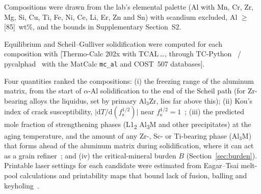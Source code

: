 \documentclass[preprint,12pt]{elsarticle}
\newcommand{\note}[1]{}
\newcommand{\note}[1]{\textcolor{blue!70!black}{\textsf{\footnotesize [Note: #1]}}}
\newcommand{\placeholder}[1]{\textcolor{red!75!black}{[#1]}}
\begin{document}
Compositions were drawn from the lab's elemental palette (Al with Mn, Cr, Zr, Mg, Si, Cu, Ti, Fe, Ni, Ce, Li, Er, Zn and Sn) with scandium excluded, Al $\geq$ \placeholder{85}~wt\%, and the bounds in Supplementary Section~S2.
\note{The kickoff (11:29) suggested keeping Si out unless composition can be verified for Si-bearing alloys. Spark-OES (ASTM E1251) on a printed coupon avoids the digestion problem; decide before the screen.}
Equilibrium and Scheil--Gulliver solidification were computed for each composition with \placeholder{Thermo-Calc 202x with TCAL\,\dots, through TC-Python~\cite{andersson2002} / pycalphad~\cite{otis2017} with the MatCalc \texttt{mc\_al} and COST~507 databases}.
\note{No Thermo-Calc licence yet (\#141). The open-database screen cannot predict the Al\textsubscript{3}Zr liquidus (MatCalc mc\_al has none, per \#275), which matters for every Zr-bearing candidate. If Thermo-Calc arrives late, re-check the finalists in it and report both.}
Four quantities ranked the compositions:
(i) the freezing range of the aluminum matrix, from the start of $\alpha$-Al solidification to the end of the Scheil path (for Zr-bearing alloys the liquidus, set by primary Al$_3$Zr, lies far above this);
(ii) Kou's index of crack susceptibility, $\lvert \mathrm{d}T / \mathrm{d}(f_\mathrm{s}^{1/2}) \rvert$ near $f_\mathrm{s}^{1/2} = 1$~\cite{kou2015};
(iii) the predicted mole fraction of strengthening phases (L1\textsubscript{2} Al\textsubscript{3}M and other precipitates) at the aging temperature, and the amount of any Zr-, Sc- or Ti-bearing phase (Al$_3$M) that forms ahead of the aluminum matrix during solidification, where it can act as a grain refiner~\cite{croteau2018,spierings2017}; and
(iv) the critical-mineral burden $B$ (Section~\ref{sec:burden}).
Printable laser settings for each candidate were estimated from Eagar--Tsai melt-pool calculations and printability maps that bound lack of fusion, balling and keyholing~\cite{eagar1983,johnson2019}.
\end{document}

